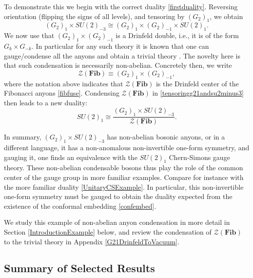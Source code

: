 \documentclass[11pt]{article}
\numberwithin{equation}{section}
\begin{document}
To demonstrate this we begin with the correct duality \eqref{firstduality}. Reversing orientation (flipping the signs of all levels), and tensoring by $(G_{2})_{1}$, we obtain
\begin{equation}
    (G_{2})_{1} \times SU(2)_{-3} \cong (G_{2})_{1} \times (G_{2})_{-1} \times SU(2)_{1}. \label{tensoringg21andsu2minus3}
\end{equation}
We now use that $(G_{2})_{1} \times (G_{2})_{-1}$ is a Drinfeld double, i.e., it is of the form $G_{k} \times G_{-k}$.  In particular for any such theory it is known that one can gauge/condense all the anyons and obtain a trivial theory \cite{davydov2013witt, muger2001subfactors,Davydov:2011pp}. The novelty here is that such condensation is necessarily non-abelian. Concretely then, we write
\begin{equation}
    \mathcal{Z}(\mathbf{Fib})\equiv (G_{2})_{1} \times (G_{2})_{-1},
\end{equation} 
where the notation above indicates that $\mathcal{Z}(\mathbf{Fib})$ is the Drinfeld center of the Fibonacci anyons \eqref{fibfuse}. Condensing $\mathcal{Z}(\mathbf{Fib})$ in \eqref{tensoringg21andsu2minus3} then leads to a new duality:
\begin{equation} \label{su21intermsofnoninvertiblecondensation}
    SU(2)_{1} \cong \frac{(G_{2})_{1} \times SU(2)_{-3}}{\mathcal{Z}(\mathbf{Fib})}.
\end{equation}

In summary, $(G_{2})_{1} \times SU(2)_{-3}$ has non-abelian bosonic anyons, or in a different language, it has a non-anomalous non-invertible one-form symmetry, and gauging it, one finds an equivalence with the $SU(2)_{1}$ Chern-Simons gauge theory.
These non-abelian condensable bosons thus play the role of the common center of the gauge group in more familiar examples. Compare for instance with the more familiar duality \eqref{UnitaryCSExample}. In particular, this non-invertible one-form symmetry must be gauged to obtain the duality expected from the existence of the conformal embedding \eqref{confembed}. 

We study this example of non-abelian anyon condensation in more detail in Section \ref{IntroductionExample} below, and review the condensation of $\mathcal{Z}(\mathbf{Fib})$ to the trivial theory in Appendix \ref{G21DrinfeldToVacuum}.
 

\subsection{Summary of Selected Results}\label{sec:summaryofresults}
\end{document}
